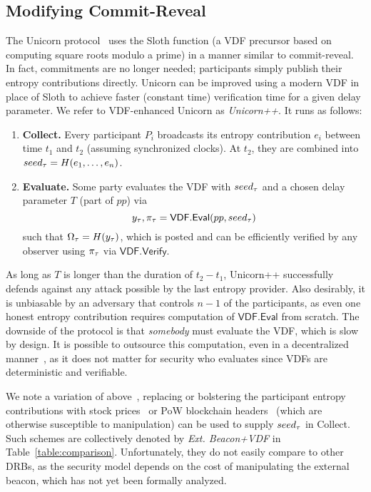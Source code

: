 \subsection{Modifying Commit-Reveal}
\label{subsection:modifying-commit-reveal}
The Unicorn protocol~\cite{lenstra2015random} uses the Sloth function (a VDF precursor based on computing square roots modulo a prime) in a manner similar to commit-reveal. In fact, commitments are no longer needed; participants simply publish their entropy contributions directly. Unicorn can be improved using a modern VDF in place of Sloth to achieve faster (constant time) verification time for a given delay parameter. We refer to VDF-enhanced Unicorn as \textit{Unicorn++}. It runs as follows:
\begin{enumerate}
    \item \textbf{Collect.} Every participant $P_i$ broadcasts its entropy contribution $e_i$ between time $t_1$ and $t_2$ (assuming synchronized clocks). At $t_2$, they are combined into $seed_\tau = H(e_1,\ldots, e_n)$.
    \item \textbf{Evaluate.} Some party evaluates the VDF with $seed_\tau$ and a chosen delay parameter $T$ (part of $pp$) via
    $$y_\tau, \pi_\tau = \mathsf{VDF.Eval}(pp, seed_\tau)$$
    such that $\Omega_\tau = H(y_\tau)$, which is posted and can be efficiently verified by any observer using $\pi_\tau$ via $\mathsf{VDF.Verify}$.
\end{enumerate}
As long as $T$ is longer than the duration of $t_2 - t_1$, Unicorn++ successfully defends against any attack possible by the last entropy provider. Also desirably, it is unbiasable by an adversary that controls $n - 1$ of the participants, as even one honest entropy contribution requires computation of $\mathsf{VDF.Eval}$ from scratch. The downside of the protocol is that \emph{somebody} must evaluate the VDF, which is slow by design. It is possible to outsource this computation, even in a decentralized manner~\cite{thyagarajan2021opensquare}, as it does not matter for security who evaluates since VDFs are deterministic and verifiable. %

We note a variation of above~\cite{bunz2017proofs, bonneau2015bitcoin}, replacing or bolstering the participant entropy contributions with  stock prices~\cite{clark2010use} or PoW blockchain headers~\cite{nakamoto2008bitcoin, bentov2016bitcoin, han2020randchain} (which are otherwise susceptible to manipulation) can be used to supply $seed_\tau$ in Collect. Such schemes are collectively denoted by \textit{Ext. Beacon+VDF} in Table~\ref{table:comparison}.
Unfortunately, they do not easily compare to other DRBs, as the security model depends on the cost of manipulating the external beacon, which has not yet been formally analyzed.

